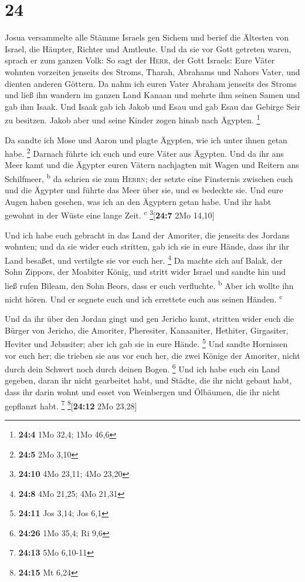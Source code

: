 \hypertarget{section-23}{%
\section{24}\label{section-23}}

 Josua versammelte alle Stämme Israels gen Sichem und
berief die Ältesten von Israel, die Häupter, Richter und Amtleute. Und
da sie vor Gott getreten waren,  sprach er zum ganzen
Volk: So sagt der \textsc{Herr}, der Gott Israels: Eure Väter wohnten
vorzeiten jenseits des Stroms, Tharah, Abrahams und Nahors Vater, und
dienten anderen Göttern.  Da nahm ich euren Vater Abraham
jenseits des Stroms und ließ ihn wandern im ganzen Land Kanaan und
mehrte ihm seinen Samen und gab ihm Isaak.  Und Isaak gab
ich Jakob und Esau und gab Esau das Gebirge Seir zu besitzen. Jakob aber
und seine Kinder zogen hinab nach Ägypten. \footnote{\textbf{24:4} 1Mo
  32,4; 1Mo 46,6}

 Da sandte ich Mose und Aaron und plagte Ägypten, wie ich
unter ihnen getan habe. \footnote{\textbf{24:5} 2Mo 3,10} 
Darnach führte ich euch und eure Väter aus Ägypten. Und da ihr ans Meer
kamt und die Ägypter euren Vätern nachjagten mit Wagen und Reitern ans
Schilfmeer, \textsuperscript{b}  da schrien sie zum
\textsc{Herrn}; der setzte eine Finsternis zwischen euch und die Ägypter
und führte das Meer über sie, und es bedeckte sie. Und eure Augen haben
gesehen, was ich an den Ägyptern getan habe. Und ihr habt gewohnt in der
Wüste eine lange Zeit. \textsuperscript{c} \footnote{\textbf{24:10} 4Mo
  23,11; 4Mo 23,20}{[}\textbf{24:7} 2Mo 14,10{]}

 Und ich habe euch gebracht in das Land der Amoriter, die
jenseits des Jordans wohnten; und da sie wider euch stritten, gab ich
sie in eure Hände, dass ihr ihr Land besaßet, und vertilgte sie vor euch
her. \footnote{\textbf{24:8} 4Mo 21,25; 4Mo 21,31}  Da
machte sich auf Balak, der Sohn Zippors, der Moabiter König, und stritt
wider Israel und sandte hin und ließ rufen Bileam, den Sohn Beors, dass
er euch verfluchte. \textsuperscript{b}  Aber ich wollte
ihn nicht hören. Und er segnete euch und ich errettete euch aus seinen
Händen. \textsuperscript{c}

 Und da ihr über den Jordan gingt und gen Jericho kamt,
stritten wider euch die Bürger von Jericho, die Amoriter, Pheresiter,
Kanaaniter, Hethiter, Girgasiter, Heviter und Jebusiter; aber ich gab
sie in eure Hände. \footnote{\textbf{24:11} Jos 3,14; Jos 6,1}
 Und sandte Hornissen vor euch her; die trieben sie aus
vor euch her, die zwei Könige der Amoriter, nicht durch dein Schwert
noch durch deinen Bogen. \footnote{\textbf{24:26} 1Mo 35,4; Ri 9,6}
 Und ich habe euch ein Land gegeben, daran ihr nicht
gearbeitet habt, und Städte, die ihr nicht gebaut habt, dass ihr darin
wohnt und esset von Weinbergen und Ölbäumen, die ihr nicht gepflanzt
habt. \footnote{\textbf{24:13} 5Mo 6,10-11} \footnote{\textbf{24:15} Mt
  6,24}{[}\textbf{24:12} 2Mo 23,28{]}

